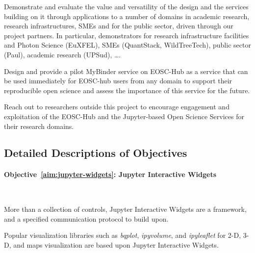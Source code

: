 \begin{compactenum}
\item \label{aim:demonstrators}%
  Demonstrate and evaluate the value and versatility of the design and
  the services building on it through applications to a number of
  domains in academic research, research infrastructures, SMEs and for
  the public sector, driven through our project partners. In
  particular, demonstrators for research infrastructure facilities and
  Photon Science (EuXFEL), SMEs (QuantStack, WildTreeTech), public
  sector (Paul), academic research (UPSud), \ldots.


\item \label{aim:binderservice}%
  Design and provide a pilot MyBinder service on EOSC-Hub as a service
  that can be used immediately for EOSC-hub users from any domain to
  support their reproducible open science and assess the importance of
  this service for the future.

\item \label{aim:outreach-and-engagement}%
  Reach out to researchers outside this project to encourage engagement
  and exploitation of the EOSC-Hub and the Jupyter-based Open Science
  Services for their research domains.


\end{compactenum}

\subsection*{Detailed Descriptions of Objectives}

\paragraph{Objective~\ref{aim:jupyter-widgets}: Jupyter Interactive Widgets}\

More than a collection of controls, Jupyter Interactive Widgets are a
framework, and a specified communication protocol to build upon.

Popular visualization libraries such as \emph{bqplot}, \emph{ipyvolume}, and
\emph{ipyleaflet} for 2-D, 3-D, and maps visualization are based upon Jupyter
Interactive Widgets.

